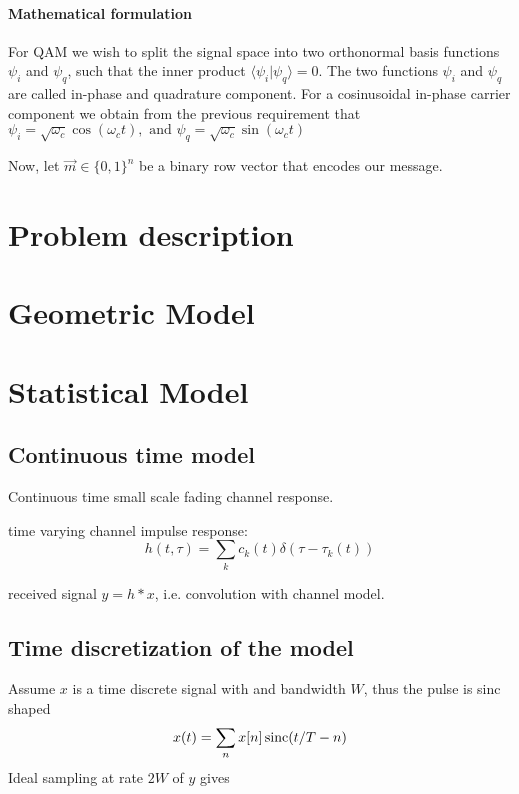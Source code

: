 \paragraph{Mathematical formulation}

For QAM we wish to split the signal space into two orthonormal basis functions \(\psi_i\) and \(\psi_q\), such that the inner product \(\langle \psi_i | \psi_q \rangle = 0\). The two functions \(\psi_i\) and \(\psi_q\) are called in-phase and quadrature component. For a cosinusoidal in-phase carrier component we obtain from the previous requirement that \(\psi_i = \sqrt{\omega_c} \cos(\omega_c t), \text{ and } \psi_q = \sqrt{\omega_c} \sin(\omega_c t)\)

Now, let \(\vec{m} \in \{0,1\}^n\) be a binary row vector that encodes our message.

\section{Problem description}

\section{Geometric Model}

\section{Statistical Model}


\subsection{Continuous time model}

Continuous time small scale fading channel response. \cite{Alimohammad2009}

time varying channel impulse response:
\begin{equation}
	h(t, \tau) = \sum_k c_k (t) \delta(\tau - \tau_k(t))
\end{equation}

received signal \(y = h * x\), i.e. convolution with channel model. 

\subsection{Time discretization of the model}


Assume \(x\) is a time discrete signal with and bandwidth \(W\), thus the pulse is sinc shaped
\begin{equation}
	x(t) = \sum_n x[n] \operatorname{sinc}(t/T - n)
\end{equation}
Ideal sampling at rate \(2W\) of \(y\) gives
